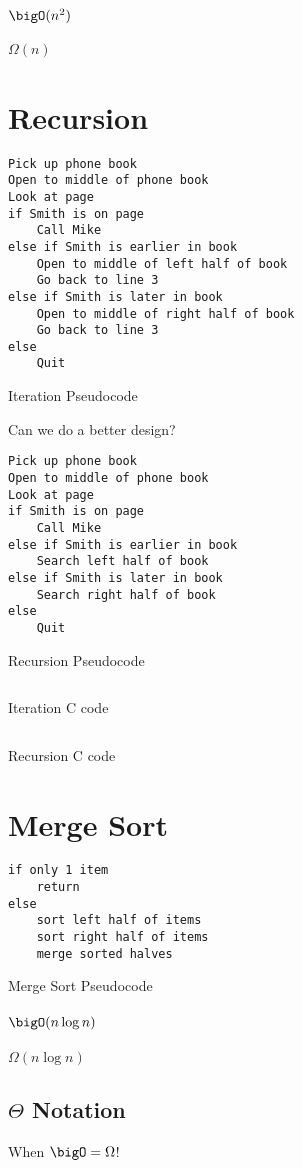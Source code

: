 \paragraph{$\bigO(n^2)$}
\paragraph{$\Omega(n)$}
\section{Recursion}
\begin{code}
	\begin{verbatim}
Pick up phone book
Open to middle of phone book
Look at page
if Smith is on page
	Call Mike
else if Smith is earlier in book
	Open to middle of left half of book
	Go back to line 3
else if Smith is later in book
	Open to middle of right half of book
	Go back to line 3
else 
	Quit
	\end{verbatim}
	\caption{Iteration Pseudocode}
\end{code}

Can we do a better design?

\begin{code}
	\begin{verbatim}
Pick up phone book
Open to middle of phone book
Look at page
if Smith is on page
	Call Mike
else if Smith is earlier in book
	Search left half of book
else if Smith is later in book
	Search right half of book
else 
	Quit
	\end{verbatim}
	\caption{Recursion Pseudocode}
\end{code}

\begin{code}
	\inputminted[linenos,breaklines]{c}{codes/src3/iteration.c}
	\caption{Iteration C code}
\end{code}
\begin{code}
	\inputminted[linenos,breaklines]{c}{codes/src3/recursion.c}
	\caption{Recursion C code}
\end{code}

\clearpage
\section{Merge Sort}
\begin{code}
	\begin{verbatim}
if only 1 item
	return
else
	sort left half of items
	sort right half of items
	merge sorted halves
	\end{verbatim}
	\caption{Merge Sort Pseudocode}
\end{code}
\paragraph{$\bigO(n\log{n})$}
\paragraph{$\Omega(n\log{n})$}
\subsection{\texorpdfstring{$\Theta$ Notation}{}}
When $\bigO = \Omega$!
